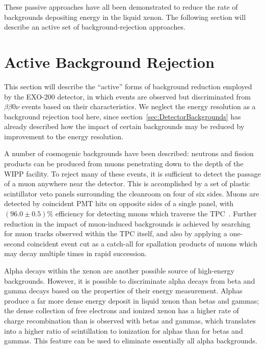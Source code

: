 These passive approaches have all been demonstrated to reduce the rate of backgrounds depositing energy in the liquid xenon.  The following section will describe an active set of background-rejection approaches.

\section{Active Background Rejection}\label{sec:DetectorActiveBackgroundRejection}

This section will describe the ``active'' forms of background reduction employed by the EXO-200 detector, in which events are observed but discriminated from $\beta\beta 0\nu$ events based on their characteristics.  We neglect the energy resolution as a background rejection tool here, since section~\ref{sec:DetectorBackgrounds} has already described how the impact of certain backgrounds may be reduced by improvement to the energy resolution.

A number of cosmogenic backgrounds have been described: neutrons and fission products can be produced from muons penetrating down to the depth of the WIPP facility.  To reject many of these events, it is sufficient to detect the passage of a muon anywhere near the detector.  This is accomplished by a set of plastic scintillator veto panels surrounding the cleanroom on four of six sides.  Muons are detected by coincident PMT hits on opposite sides of a single panel, with $(96.0 \pm 0.5)\%$ efficiency for detecting muons which traverse the TPC~\cite{detectorPartI}.  Further reduction in the impact of muon-induced backgrounds is achieved by searching for muon tracks observed within the TPC itself, and also by applying a one-second coincident event cut as a catch-all for spallation products of muons which may decay multiple times in rapid succession.

Alpha decays within the xenon are another possible source of high-energy backgrounds.  However, it is possible to discriminate alpha decays from beta and gamma decays based on the properties of their energy measurement.  Alphas produce a far more dense energy deposit in liquid xenon than betas and gammas; the dense collection of free electrons and ionized xenon has a higher rate of charge recombination than is observed with betas and gammas, which translates into a higher ratio of scintillation to ionization for alphas than for betas and gammas.  This feature can be used to eliminate essentially all alpha backgrounds.


